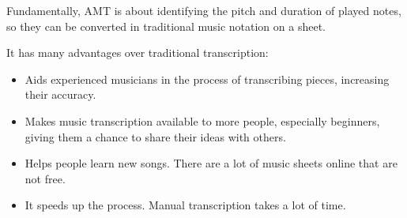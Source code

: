 Fundamentally, AMT is about identifying the pitch and duration of played notes, so they can be converted in traditional music notation on a sheet. \par

It has many advantages over traditional transcription:
\begin{itemize}
	\item Aids experienced musicians in the process of transcribing pieces, increasing their accuracy.
	\item Makes music transcription available to more people, especially beginners, giving them a chance to share their ideas with others.
	\item Helps people learn new songs. There are a lot of music sheets online that are not free. 
	\item It speeds up the process. Manual transcription takes a lot of time.
\end{itemize}